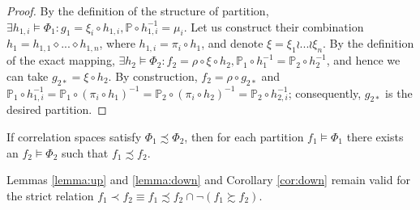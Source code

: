 \begin{proof}
	By the definition of the structure of partition, $\exists h_{1,i} \models \Phi_1 : g_1 = \xi_i \circ h_{1,i}, \mathbb{P} \circ h_{1,i}^{-1} = \mu_i$. Let us construct their combination $h_1 = h_{1,1} \diamond ... \diamond h_{1,n}$, where $h_{1,i} = \pi_i \circ h_1$, and denote $\xi = \xi_1 \wr ... \wr \xi_n$. By the definition of the exact mapping, $\exists h_2 \models \Phi_2 : f_2 = \rho \circ \xi \circ h_2, \mathbb{P}_1 \circ h_1^{-1} = \mathbb{P}_2 \circ h_2^{-1}$, and hence we can take $g_{2*} = \xi \circ h_2$. By construction, $f_2 = \rho \circ g_{2*}$ and $\mathbb{P}_1 \circ h_{1,i}^{-1} = \mathbb{P}_1 \circ (\pi_i \circ h_1)^{-1} = \mathbb{P}_2 \circ (\pi_i \circ h_2)^{-1} = \mathbb{P}_2 \circ h_{2,i}^{-1}$; consequently, $g_{2*}$ is the desired partition. %
\end{proof}

\begin{corollary} \label{cor:down}
	If correlation spaces satisfy $\Phi_1 \precsim \Phi_2$, then for each partition $f_1 \models \Phi_1$ there exists an $f_2 \models \Phi_2$ such that $f_1 \precsim f_2$. %
\end{corollary}

\begin{corollary}
	Lemmas \ref{lemma:up} and \ref{lemma:down} and Corollary \ref{cor:down} remain valid for the strict relation $f_1 \prec f_2 \equiv f_1 \precsim f_2 \cap \neg (f_1 \succsim f_2)$. %
\end{corollary}

